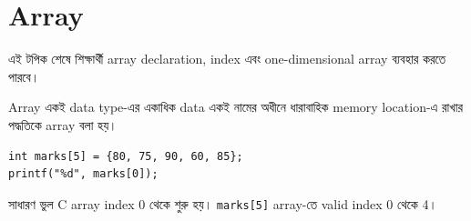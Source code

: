 \section{Array}

\begin{learningbox}
এই টপিক শেষে শিক্ষার্থী array declaration, index এবং one-dimensional array ব্যবহার করতে পারবে।
\end{learningbox}

\begin{definitionbox}{Array}
একই data type-এর একাধিক data একই নামের অধীনে ধারাবাহিক memory location-এ রাখার পদ্ধতিকে array বলা হয়।
\end{definitionbox}

\begin{center}
\end{center}

\begin{verbatim}
int marks[5] = {80, 75, 90, 60, 85};
printf("%d", marks[0]);
\end{verbatim}

\begin{mistakebox}{সাধারণ ভুল}
C array index 0 থেকে শুরু হয়। \texttt{marks[5]} array-তে valid index 0 থেকে 4।
\end{mistakebox}
